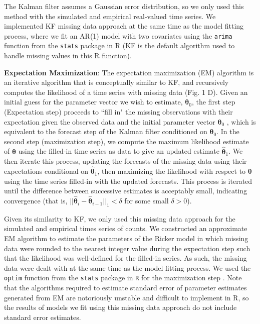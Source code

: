 \documentclass[12pt,english]{article} %
\begin{document}
The Kalman filter assumes a Gaussian error distribution, so we only used this method with the simulated and empirical real-valued time series. We implemented KF missing data approach at the same time as the model fitting process, where we fit an AR(1) model with two covariates using the \texttt{arima} function from the \texttt{stats} package in R \citep{r_2021} (KF is the default algorithm used to handle missing values in this R function). 


\textbf{Expectation Maximization}: The expectation maximization (EM) algorithm is an iterative algorithm that is conceptually similar to KF, and recursively computes the likelihood of a time series with missing data (Fig. 1 D). Given an initial guess for the parameter vector we wish to estimate, ${\bm \theta}_0$, the first step (Expectation step) proceeds to ``fill in" the missing observations with their expectation given the observed data and the initial parameter vector ${\bm \theta}_0$ %
, which is equivalent to the forecast step of the Kalman filter conditioned on ${\bm \theta}_0$. In the second step (maximization step), we compute the maximum likelihood estimate of ${\bm \theta}$ using the filled-in time series as data to give an updated estimate $\hat {\bm \theta}_1$. We then iterate this process, updating the forecasts of the missing data using their expectations conditional on $\hat {\bm \theta}_1$, then maximizing the likelihood with respect to $\bm \theta$ using the time series filled-in with the updated forecasts. This process is iterated until the difference between successive estimates is acceptably small, indicating convergence (that is, $||\hat {\bm \theta}_i - \hat {\bm \theta}_{i-1}||_1 < \delta$ for some small $\delta > 0$).

Given its similarity to KF, we only used this missing data approach for the simulated and empirical times series of counts. We constructed an approximate EM algorithm to estimate the parameters of the Ricker model in which missing data were rounded to the nearest integer value during the expectation step such that the likelihood was well-defined for the filled-in series. As such, the missing data were dealt with at the same time as the model fitting process. We used the \texttt{optim} function from the \texttt{stats} package in \texttt{R} for the maximization step \citep{r_2021}. %
Note that the algorithms required to estimate standard error of parameter estimates generated from EM are notoriously unstable and difficult to implement in R, so the results of models we fit using this missing data approach do not include standard error estimates. 
\end{document}
